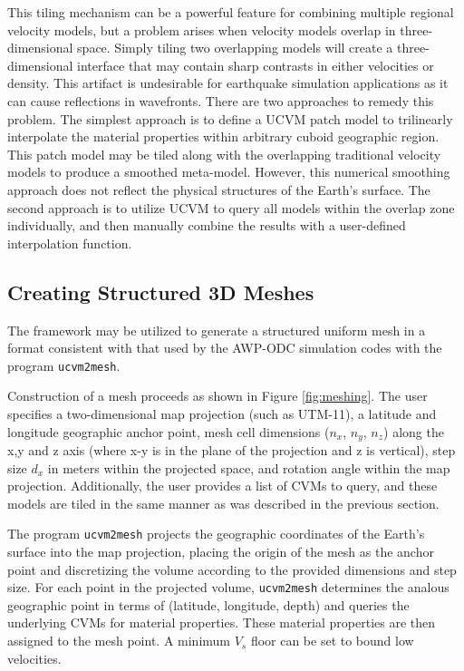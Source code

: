 This tiling mechanism can be a powerful feature for combining multiple regional velocity models, but a problem arises when velocity models overlap in three-dimensional space. Simply tiling two overlapping models will create a three-dimensional interface that may contain sharp contrasts in either velocities or density. This artifact is undesirable for earthquake simulation applications as it can cause reflections in wavefronts. There are two approaches to remedy this problem. The simplest approach is to define a UCVM patch model to trilinearly interpolate the material properties within arbitrary cuboid geographic region. This patch model may be tiled along with the overlapping traditional velocity models to produce a smoothed meta-model. However, this numerical smoothing approach does not reflect the physical structures of the Earth's surface. The second approach is to utilize UCVM to query all models within the overlap zone individually, and then manually combine the results with a user-defined interpolation function. 



\subsection{Creating Structured 3D Meshes}

The framework may be utilized to generate a structured uniform mesh in a format consistent with that used by the AWP-ODC simulation codes with the program \texttt{ucvm2mesh}.

Construction of a mesh proceeds as shown in Figure \ref{fig:meshing}. The user specifies a two-dimensional map projection (such as UTM-11), a latitude and longitude geographic anchor point, mesh cell dimensions ($n_x$, $n_y$, $n_z$) along the x,y and z axis (where x-y is in the plane of the projection and z is vertical), step size $d_x$ in meters within the projected space, and rotation angle within the map projection. Additionally, the user provides a list of CVMs to query, and these models are tiled in the same manner as was described in the previous section.

The program \texttt{ucvm2mesh} projects the geographic coordinates of the Earth's surface into the map projection, placing the origin of the mesh as the anchor point and discretizing the volume according to the provided dimensions and step size. For each point in the projected volume, \texttt{ucvm2mesh} determines the analous geographic point in terms of (latitude, longitude, depth) and queries the underlying CVMs for material properties. These material properties are then assigned to the mesh point. A minimum $V_s$ floor can be set to bound low velocities.

